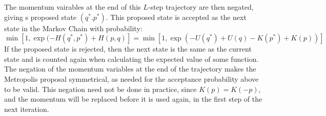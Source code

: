\documentclass[]{report}
\begin{document}
The momentum vairables at the end of this $L$-step trajectory are then negated, giving s proposed state $(q^{*}. p^{*})$. This proposed state is accepted as the next state in the Markov Chain with probability: \begin{equation}
\min[1, \exp(-H(q^{*}, p^{*}) + H(p,q)] = \min[1, \exp(-U(q^{*}) + U(q) - K(p^{*}) + K(p))]
\end{equation} 
If the proposed state is rejected, then the next state is the same as the current state and is counted again when calculating the expected value of some function. 
The negation of the momentum variables at the end of the trajectory makes the Metropolis proposal symmetrical, as needed for the acceptance probability above to be valid. This negation need not be done in practice, since $K(p) = K(-p)$, and the momentum will be replaced before it is used again, in the first step of the next iteration.
\end{document}

